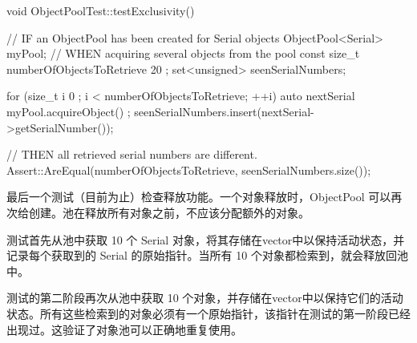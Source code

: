 \begin{cpp}
void ObjectPoolTest::testExclusivity()
{
    // IF an ObjectPool has been created for Serial objects
    ObjectPool<Serial> myPool;
    // WHEN acquiring several objects from the pool
    const size_t numberOfObjectsToRetrieve { 20 };
    set<unsigned> seenSerialNumbers;

    for (size_t i { 0 }; i < numberOfObjectsToRetrieve; ++i) {
        auto nextSerial { myPool.acquireObject() };
        seenSerialNumbers.insert(nextSerial->getSerialNumber());
    }

    // THEN all retrieved serial numbers are different.
    Assert::AreEqual(numberOfObjectsToRetrieve, seenSerialNumbers.size());
}
\end{cpp}

最后一个测试（目前为止）检查释放功能。一个对象释放时，ObjectPool 可以再次给创建。池在释放所有对象之前，不应该分配额外的对象。

测试首先从池中获取 10 个 Serial 对象，将其存储在vector中以保持活动状态，并记录每个获取到的 Serial 的原始指针。当所有 10 个对象都检索到，就会释放回池中。

测试的第二阶段再次从池中获取 10 个对象，并存储在vector中以保持它们的活动状态。所有这些检索到的对象必须有一个原始指针，该指针在测试的第一阶段已经出现过。这验证了对象池可以正确地重复使用。

